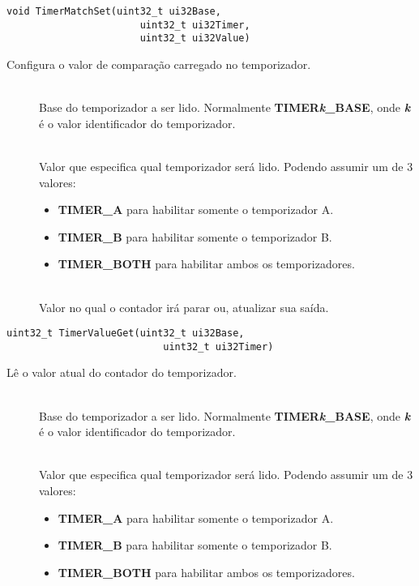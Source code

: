 \begin{lstlisting}[style=funcao]
	void TimerMatchSet(uint32_t ui32Base,
					   uint32_t ui32Timer,
					   uint32_t ui32Value)
\end{lstlisting}

Configura o valor de comparação carregado no temporizador.

\begin{description}
	\item []\hfill \\
	Base do temporizador a ser lido. Normalmente \textbf{TIMER\emph{k}\_BASE}, onde \textbf{\emph{k}} é o valor identificador do temporizador.
	
	\item []\hfill \\
	Valor que especifica qual temporizador será lido. Podendo assumir um de 3 valores:
	\begin{itemize}
		\item \textbf{TIMER\_A} para habilitar somente o temporizador A.
		\item \textbf{TIMER\_B} para habilitar somente o temporizador B.
		\item \textbf{TIMER\_BOTH} para habilitar ambos os temporizadores.
	\end{itemize}
	
	\item []\hfill \\
	Valor no qual o contador irá parar ou, atualizar sua saída.
\end{description}

\begin{lstlisting}[style=funcao]
	uint32_t TimerValueGet(uint32_t ui32Base,
						   uint32_t ui32Timer)
\end{lstlisting}

Lê o valor atual do contador do temporizador.

\begin{description}
	\item []\hfill \\
	Base do temporizador a ser lido. Normalmente \textbf{TIMER\emph{k}\_BASE}, onde \textbf{\emph{k}} é o valor identificador do temporizador.
	
	\item []\hfill \\
	Valor que especifica qual temporizador será lido. Podendo assumir um de 3 valores:
	\begin{itemize}
		\item \textbf{TIMER\_A} para habilitar somente o temporizador A.
		\item \textbf{TIMER\_B} para habilitar somente o temporizador B.
		\item \textbf{TIMER\_BOTH} para habilitar ambos os temporizadores.
	\end{itemize}
\end{description}

